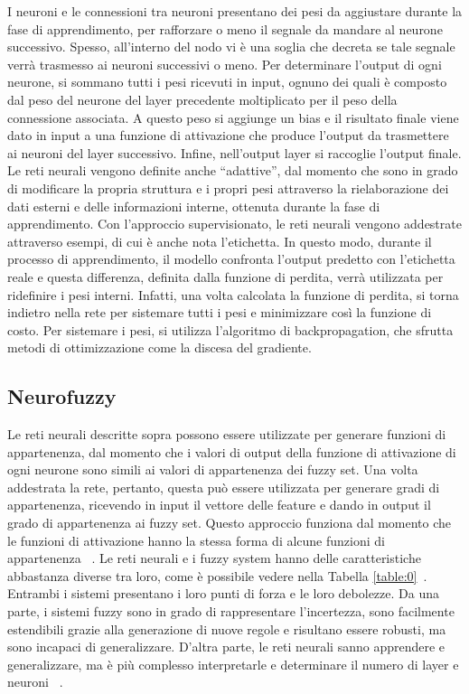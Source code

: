 \documentclass[11pt,  oneside, openany]{book}
\begin{document}
I neuroni e le connessioni tra neuroni presentano dei pesi da aggiustare durante la fase di apprendimento, per rafforzare o meno il segnale da mandare al neurone successivo. Spesso, all'interno del nodo vi è una soglia che decreta se tale segnale verrà trasmesso ai neuroni successivi o meno. Per determinare l'output di ogni neurone, si sommano tutti i pesi ricevuti in input, ognuno dei quali è composto dal peso del neurone del layer precedente moltiplicato per il peso della connessione associata. A questo peso si aggiunge un bias e il risultato finale viene dato in input a una funzione di attivazione che produce l'output da trasmettere ai neuroni del layer successivo. Infine, nell'output layer si raccoglie l'output finale. 
Le reti neurali vengono definite anche ``adattive'', dal momento che sono in grado di modificare la propria struttura e i propri pesi attraverso la rielaborazione dei dati esterni e delle informazioni interne, ottenuta durante la fase di apprendimento. Con l'approccio supervisionato, le reti neurali vengono addestrate attraverso esempi, di cui è anche nota l'etichetta. In questo modo, durante il processo di apprendimento, il modello confronta l'output predetto con l'etichetta reale e questa differenza, definita dalla funzione di perdita, verrà utilizzata per ridefinire i pesi interni. Infatti, una volta calcolata la funzione di perdita, si torna indietro nella rete per sistemare tutti i pesi e minimizzare così la funzione di costo. Per sistemare i pesi, si utilizza l'algoritmo di backpropagation, che sfrutta metodi di ottimizzazione come la discesa del gradiente. 



\subsection{Neurofuzzy}
Le reti neurali descritte sopra possono essere utilizzate per generare funzioni di appartenenza, dal momento che i valori di output della funzione di attivazione di ogni neurone sono simili ai valori di appartenenza dei fuzzy set. Una volta addestrata la rete, pertanto, questa può essere utilizzata per generare gradi di appartenenza, ricevendo in input il vettore delle feature e dando in output il grado di appartenenza ai fuzzy set. Questo approccio funziona dal momento che le funzioni di attivazione hanno la stessa forma di
alcune funzioni di appartenenza ~\cite{membneuralnetwsimilar}. Le reti neurali e i fuzzy system hanno delle caratteristiche abbastanza diverse tra loro, come è possibile vedere nella Tabella \ref{table:0}~\cite{neurofuzzyintro}. Entrambi i sistemi presentano i loro punti di forza e le loro debolezze. Da una parte, i sistemi fuzzy sono in grado di rappresentare l'incertezza, sono facilmente estendibili grazie alla generazione di nuove regole e risultano essere robusti, ma sono incapaci di generalizzare. D'altra parte, le reti neurali sanno apprendere e generalizzare, ma è più complesso interpretarle e determinare il numero di layer e neuroni ~\cite{surveyneurofuzzy}.
\end{document}
